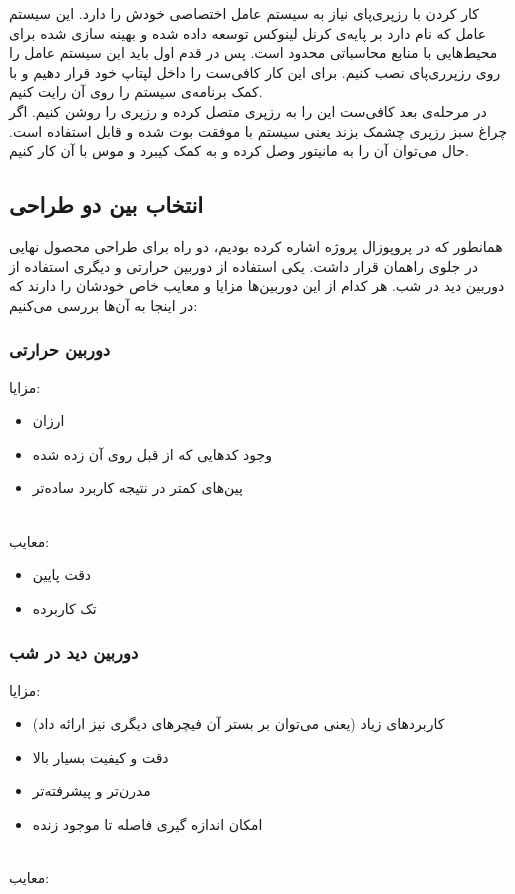 \documentclass[12pt]{article}
\begin{document}
کار کردن با رزپری‌پای نیاز به سیستم عامل اختصاصی خودش را دارد. این سیستم عامل که 
 نام دارد بر پایه‌ی کرنل لینوکس توسعه داده شده و بهینه سازی شده برای محیط‌هایی با منابع محاسباتی محدود است.
 پس در قدم اول باید این سیستم عامل را روی رزپرری‌پای نصب کنیم. برای این کار کافی‌ست  را داخل لپتاپ خود قرار دهیم و با کمک برنامه‌ی  سیستم را روی آن رایت کنیم.
 \\
 
 در مرحله‌ی بعد کافی‌ست این  را به رزپری متصل کرده و رزپری را روشن کنیم. اگر چراغ سبز رزپری چشمک بزند یعنی سیستم با موفقت بوت شده و قابل استفاده است. حال می‌توان آن را به مانیتور وصل کرده و به کمک کیبرد و موس با آن کار کنیم.

\newpage
\subsection{انتخاب بین دو طراحی}
همانطور که در پروپوزال پروژه اشاره کرده بودیم، دو راه برای طراحی محصول نهایی در جلوی راهمان قرار داشت. یکی استفاده از دوربین حرارتی و دیگری استفاده از دوربین دید در شب. هر کدام از این دوربین‌ها مزایا و معایب خاص خودشان را دارند که در اینجا به آن‌ها بررسی می‌کنیم:

\subsubsection{دوربین حرارتی}

مزایا:

\begin{itemize}
    \item ارزان
    \item وجود کد‌هایی که از قبل روی آن زده شده
    \item پین‌های کمتر در نتیجه کاربرد ساده‌تر
\end{itemize}
\\
معایب:

\begin{itemize}
    \item دقت پایین
    \item تک کاربرده
\end{itemize}

\subsubsection{دوربین دید در شب}

مزایا:

\begin{itemize}
    \item کاربرد‌های زیاد (یعنی می‌توان بر بستر آن فیچرهای دیگری نیز ارائه داد)
    \item دقت و کیفیت بسیار بالا
    \item مدرن‌تر و پیشرفته‌تر
    \item امکان اندازه گیری فاصله تا موجود زنده
\end{itemize}
\\
معایب:
\end{document}
